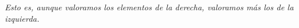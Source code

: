 \documentclass[journal]{IEEEtran}
\begin{document}
\emph{Esto es, aunque valoramos los elementos de la derecha,
valoramos más los de la izquierda.}





\ifCLASSOPTIONcaptionsoff
  \newpage
\fi





%
%
%
\end{document}
